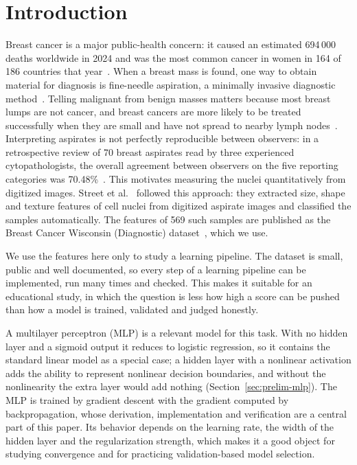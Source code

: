 \section{Introduction}
\label{sec:intro}

Breast cancer is a major public-health concern: it caused an estimated 694\,000 deaths worldwide in 2024 and was the most common cancer in women in 164 of 186 countries that year~\cite{who2026}. When a breast mass is found, one way to obtain material for diagnosis is fine-needle aspiration, a minimally invasive diagnostic method~\cite{yu2012}. Telling malignant from benign masses matters because most breast lumps are not cancer, and breast cancers are more likely to be treated successfully when they are small and have not spread to nearby lymph nodes~\cite{who2026}. Interpreting aspirates is not perfectly reproducible between observers: in a retrospective review of 70 breast aspirates read by three experienced cytopathologists, the overall agreement between observers on the five reporting categories was 70.48\%~\cite{boler2022}. This motivates measuring the nuclei quantitatively from digitized images. Street et al.~\cite{street1993} followed this approach: they extracted size, shape and texture features of cell nuclei from digitized aspirate images and classified the samples automatically. The features of 569 such samples are published as the Breast Cancer Wisconsin (Diagnostic) dataset~\cite{wdbc}, which we use.

We use the features here only to study a learning pipeline. The dataset is small, public and well documented, so every step of a learning pipeline can be implemented, run many times and checked. This makes it suitable for an educational study, in which the question is less how high a score can be pushed than how a model is trained, validated and judged honestly.

A multilayer perceptron (MLP) is a relevant model for this task. With no hidden layer and a sigmoid output it reduces to logistic regression, so it contains the standard linear model as a special case; a hidden layer with a nonlinear activation adds the ability to represent nonlinear decision boundaries, and without the nonlinearity the extra layer would add nothing (Section~\ref{sec:prelim-mlp}). The MLP is trained by gradient descent with the gradient computed by backpropagation, whose derivation, implementation and verification are a central part of this paper. Its behavior depends on the learning rate, the width of the hidden layer and the regularization strength, which makes it a good object for studying convergence and for practicing validation-based model selection.

